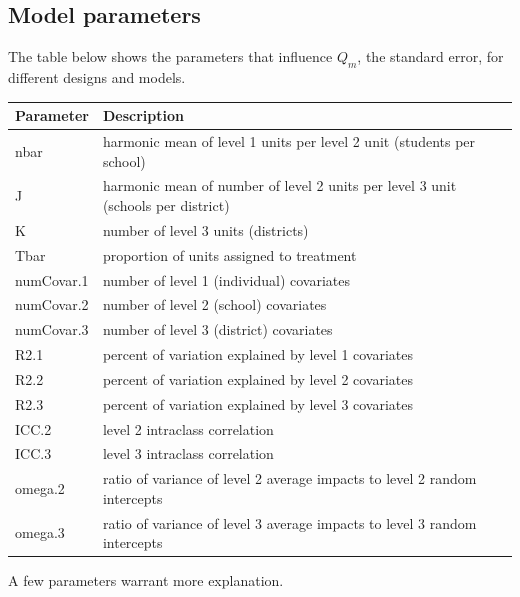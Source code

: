 \documentclass{article}
\begin{document}
\subsection{Model parameters}
\label{sec:params}

The table below shows the parameters that influence \(Q_m\), the
standard error, for different designs and models.

\begin{table}
\centering
\begin{tabular}{ll}
\toprule
Parameter & Description\\
\midrule
nbar & harmonic mean of level 1 units per
                     level 2 unit (students per school)\\
J & harmonic mean of number of level 2 
                      units per level 3 unit (schools per district)\\
K & number of level 3 units (districts)\\
Tbar & proportion of units assigned to treatment\\
numCovar.1 & number of level 1 (individual) covariates\\
\addlinespace
numCovar.2 & number of level 2 (school) covariates\\
numCovar.3 & number of level 3 (district) covariates\\
R2.1 & percent of variation explained by level 1 covariates\\
R2.2 & percent of variation explained by level 2 covariates\\
R2.3 & percent of variation explained by level 3 covariates\\
\addlinespace
ICC.2 & level 2 intraclass correlation\\
ICC.3 & level 3 intraclass correlation\\
omega.2 & ratio of variance of level 2 average impacts to
                      level 2 random intercepts\\
omega.3 & ratio of variance of level 3 average impacts to
                      level 3 random intercepts\\
\bottomrule
\end{tabular}
\end{table}

A few parameters warrant more explanation.
\end{document}
